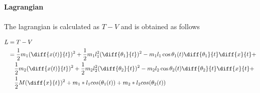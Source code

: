\documentclass[12pt]{article}
\begin{document}
\textbf{Lagrangian}  \\ \\
The lagrangian is calculated as $T - V$ and is obtained as follows

 \begin{align}
   L &= T -V \\
     &= \frac{1}{2}m_1(\diff{x(t)}{t})^2 + \frac{1}{2}m_1l_1^2(\diff{\theta _1}{t})^2 -m_1l_1\cos \theta _1(t) \diff{\theta _1}{t} \diff{x}{t} + \nonumber \\
     &\quad \frac{1}{2}m_2(\diff{x(t)}{t})^2 + \frac{1}{2}m_2l_2^2(\diff{\theta _2}{t})^2 -m_2l_2\cos \theta _2(t) \diff{\theta _2}{t} \diff{x}{t} + \nonumber \\
     &\quad \frac{1}{2}M(\diff{x}{t})^2  +m_1*l_1cos(\theta _1(t)) + m_2*l_2cos(\theta _2(t))
 \end{align}                       
\end{document}
